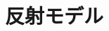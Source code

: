 \documentclass[../main]{subfiles}
\begin{document}
\graphicspath{{../figures/chap3/}}

\section{反射モデル}
\label{sec:pmethod_model}
\end{document}
